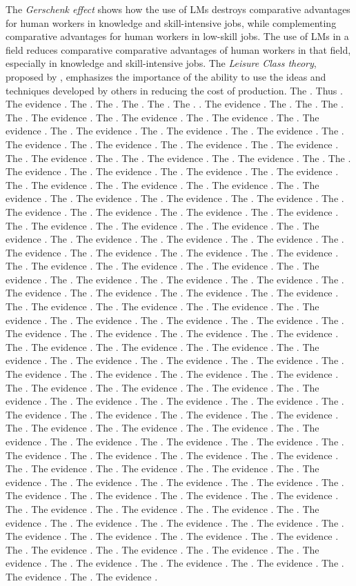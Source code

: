 {{{{The \emph{Gerschenk effect} shows how the use of LMs destroys comparative advantages for human workers in knowledge and skill-intensive jobs, while complementing comparative advantages for human workers in low-skill jobs.
The use of LMs in a field reduces comparative comparative advantages of human workers in that field, especially in knowledge and skill-intensive jobs.
The \emph{Leisure Class theory}, proposed by \citet{rothbard1981economics}, emphasizes the importance of the ability to use the ideas and techniques developed by others in reducing the cost of production.
The . Thus . The evidence . The . The . The . The . The . . The evidence . The . The . The . The . The evidence . The . The evidence . The . The evidence . The . The evidence . The . The evidence . The . The evidence . The . The evidence . The . The evidence . The . The evidence . The . The evidence . The . The evidence . The . The evidence . The . The . The evidence . The . The evidence . The . The . The evidence . The . The evidence . The . The evidence . The . The evidence . The . The evidence . The . The evidence . The . The evidence . The . The evidence . The . The evidence . The . The evidence . The . The evidence . The . The evidence . The . The evidence . The . The evidence . The . The evidence . The . The evidence . The . The evidence . The . The evidence . The . The evidence . The . The evidence . The . The evidence . The . The evidence . The . The evidence . The . The evidence . The . The evidence . The . The evidence . The . The evidence . The . The evidence . The . The evidence . The . The evidence . The . The evidence . The . The evidence . The . The evidence . The . The evidence . The . The evidence . The . The evidence . The . The evidence . The . The evidence . The . The evidence . The . The evidence . The . The evidence . The . The evidence . The . The evidence . The . The evidence . The . The evidence . The . The evidence . The . The evidence . The . The evidence . The . The evidence . The . The evidence . The . The evidence . The . The evidence . The . The evidence . The . The evidence . The . The evidence . The . The evidence . The . The evidence . The . The evidence . The . The evidence . The . The evidence . The . The evidence . The . The evidence . The . The evidence . The . The evidence . The . The evidence . The . The evidence . The . The evidence . The . The evidence . The . The evidence . The . The evidence . The . The evidence . The . The evidence . The . The evidence . The . The evidence . The . The evidence . The . The evidence . The . The evidence . The . The evidence . The . The evidence . The . The evidence . The . The evidence . The . The evidence . The . The evidence . The . The evidence . The . The evidence . The . The evidence . The . The evidence . The . The evidence . The . The evidence . The . The evidence . The . The evidence . The . The evidence . The . The evidence . The . The evidence . The . The evidence . The . The evidence . The . The evidence . The . The evidence . The . The evidence . The . The evidence . The . The evidence . The . The evidence . The . The evidence . The . The evidence . The . The evidence . The . The evidence . The . The evidence . The . The evidence . The . The evidence . The . The evidence . The . The evidence . The . The evidence . }}}}
